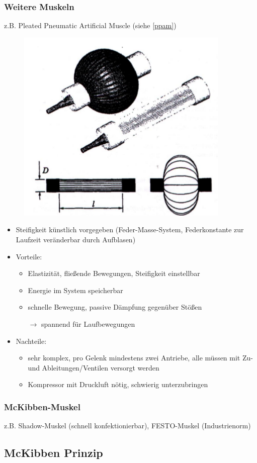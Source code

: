 \subsubsection{Weitere Muskeln}
z.B. Pleated Pneumatic Artificial Muscle (siehe \autoref{ppam}) 
\begin{figure}[h!]
	\centering
	\includegraphics[width=0.3\linewidth]{figures/ch03_ppam.png}
	\caption{}
	\label{ppam}
\end{figure}
\begin{itemize}
\item Steifigkeit künstlich vorgegeben (Feder-Masse-System, Federkonstante zur Laufzeit veränderbar durch Aufblasen)
\item Vorteile:
\begin{itemize}
\item Elastizität, fließende Bewegungen, Steifigkeit einstellbar
\item Energie im System speicherbar
\item schnelle Bewegung, passive Dämpfung gegenüber Stößen
\item[$\rightarrow$] spannend für Laufbewegungen
\end{itemize}
\item Nachteile:
\begin{itemize}
\item sehr komplex, pro Gelenk mindestens zwei  Antriebe, alle müssen mit Zu- und Ableitungen/Ventilen versorgt  werden
\item Kompressor mit Druckluft nötig, schwierig unterzubringen
\end{itemize}
\end{itemize}
\subsubsection{McKibben-Muskel}
z.B. Shadow-Muskel (schnell konfektionierbar), FESTO-Muskel (Industrienorm)
\subsection{McKibben Prinzip}
